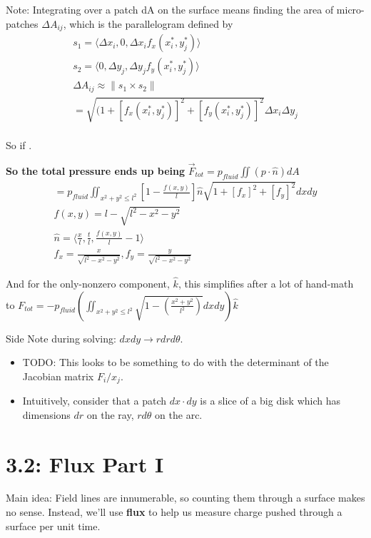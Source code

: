 \documentclass[11pt, oneside]{article}   	%
\begin{document}
Note: Integrating over a patch dA on the surface means finding the area of micro-patches 
$\Delta A_{ij}$, which is the parallelogram defined by 
\begin{align}
s_1 = \langle \Delta x_i, 0, \Delta x_i f_x(x_i^*,y_j^*) \rangle \\
s_2 = \langle 0, \Delta y_j, \Delta y_j f_y(x_i^*,y_j^*) \rangle \\ 
\Delta A_{ij} \approx \| s_1 \times s_2 \| \\ 
= \sqrt{ (1 + [ f_x(x_i^*,y_j^*)]^2 + [f_y(x_i^*,y_j^*)]^2 }\Delta x_i \Delta y_j \\ 
\end{align}

So if .


\textbf{So the total pressure ends up being}
$\vec{F}_{tot} = p_{fluid} \iint (p \cdot \hat{n}) dA$
\begin{align}
= p_{fluid} \iint_{x^2 + y^2 \leq l^2} [ 1- \frac{f(x,y)}{l}] \hat{n}  \sqrt{ 1 +  [f_x]^2 +[f_y]^2 }dxdy  \\
f(x,y) = l - \sqrt{l^2-x^2-y^2} \\
\hat{n} = \langle \frac{x}{l},\frac{t}{l}, \frac{f(x,y)}{l} - 1 \rangle \\
f_x = \frac{x}{\sqrt{l^2 - x^2 - y^2}}, f_y = \frac{y}{\sqrt{l^2 - x^2 - y^2}}
\end{align}

And for the only-nonzero component, $\hat{k}$, this simplifies after a lot of hand-math to 
$F_{tot} = -p_{fluid} ( \iint_{x^2+y^2 \leq l^2} \sqrt{1 - (\frac{x^2 + y^2}{l^2})} dx dy) \hat{k}$

Side Note during solving: $dx dy \rightarrow r dr d\theta$.  
\begin{itemize}
\item TODO: This looks to be something to do with the determinant of the Jacobian matrix $F_i / x_j$.
\item Intuitively, consider that a patch $dx \cdot dy$ is a slice of a big disk which has dimensions $dr$ on the ray, $r d\theta$ on the arc.
\end{itemize}


\section{3.2: Flux Part I}
Main idea: Field lines are innumerable, so counting them through a surface makes no sense.  Instead, we'll use \textbf{flux} to help us measure charge pushed through a surface per unit time.
\end{document}
